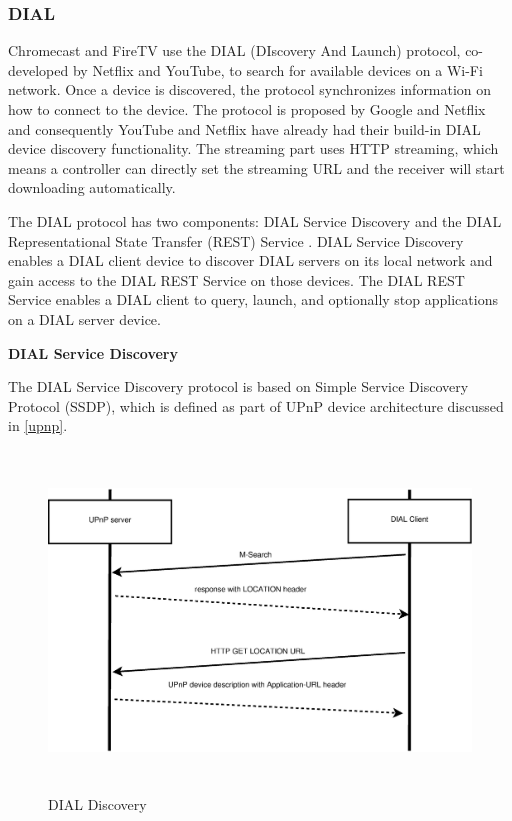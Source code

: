 \subsubsection{DIAL\label{2_2_4}} 
Chromecast and FireTV use the DIAL \cite{dial} (DIscovery And Launch) protocol,
co-developed by Netflix and YouTube, to search for available devices on a Wi-Fi network. 
Once a device is discovered, the protocol synchronizes information on how to 
connect to the device. The protocol is proposed by Google and Netflix and consequently 
YouTube and Netflix  have already had their build-in DIAL device discovery functionality. The 
streaming part uses HTTP streaming, which means a controller can directly set the 
streaming URL and the receiver will start downloading automatically.

The DIAL protocol has two components: DIAL Service Discovery and the DIAL 
Representational State Transfer (REST) Service \cite{dial}. DIAL Service
Discovery enables a DIAL client device to discover DIAL servers on its local network and gain
access to the DIAL REST Service on those devices. The DIAL REST Service enables
a DIAL client to query, launch, and optionally stop applications on a DIAL
server device.

\textbf{DIAL Service Discovery}

The DIAL Service Discovery protocol is based on Simple Service Discovery 
Protocol (SSDP), which is defined as part of UPnP device architecture discussed 
in \ref{upnp}.

\begin{figure}[htb] \centering 
\includegraphics[height=9cm]{charts/dial_discovery} 
\caption{DIAL Discovery \label{dial_discovery}} 
\end{figure} 

